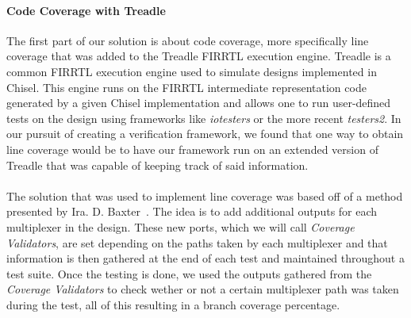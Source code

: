 \documentclass[conference]{IEEEtran}
\begin{document}
\paragraph{Code Coverage with Treadle}  
The first part of our solution is about code coverage, more specifically line coverage that was added to the Treadle FIRRTL execution engine. Treadle is a common FIRRTL execution engine used to simulate designs implemented in Chisel. This engine runs on the FIRRTL intermediate representation code generated by a given Chisel implementation and allows one to run user-defined tests on the design using frameworks like \textit{iotesters} or the more recent \textit{testers2}. In our pursuit of creating a verification framework, we found that one way to obtain line coverage would be to have our framework run on an extended version of Treadle that was capable of keeping track of said information.\\\\
The solution that was used to implement line coverage was based off of a method presented by Ira. D. Baxter~\cite{branch-cov-made-easy:2002}. The idea is to add additional outputs for each multiplexer in the design. These new ports, which we will call \textit{Coverage Validators}, are set depending on the paths taken by each multiplexer and that information is then gathered at the end of each test and maintained throughout a test suite. Once the testing is done, we used the outputs gathered from the \textit{Coverage Validators} to check wether or not a certain multiplexer path was taken during the test, all of this resulting in a branch coverage percentage. \\
\end{document}
